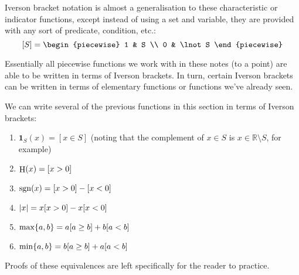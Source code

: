 Iverson bracket notation is almost a generalisation to these characteristic or indicator functions, except instead of using a set and variable, they are provided with any sort of predicate, condition, etc.:
$$
    [S]=\begin{piecewise}
        1 & S \\
        0 & \lnot S
    \end{piecewise}
$$

Essentially all piecewise functions we work with in these notes (to a point) are able to be written in terms of Iverson brackets. In turn, certain Iverson brackets can be written in terms of elementary functions or functions we've already seen.
\begin{theorem}
    We can write several of the previous functions in this section in terms of Iverson brackets:
    \begin{enumerate}
        \item $\mathbf{1}_{S}(x)=[x\in S]$ (noting that the complement of $x\in S$ is $x\in\mathbb{R}\setminus S$, for example)
        \item $\mathrm{\mathop{H}}(x)=[x>0]$
        \item $\mathrm{\mathop{sgn}}(x)=[x>0]-[x<0]$
        \item $\abs{x}=x[x>0]-x[x<0]$
        \item $\max\{a,b\}=a[a\geq b]+b[a<b]$
        \item $\min\{a,b\}=b[a\geq b]+a[a<b]$
    \end{enumerate}

    Proofs of these equivalences are left specifically for the reader to practice.
\end{theorem}

